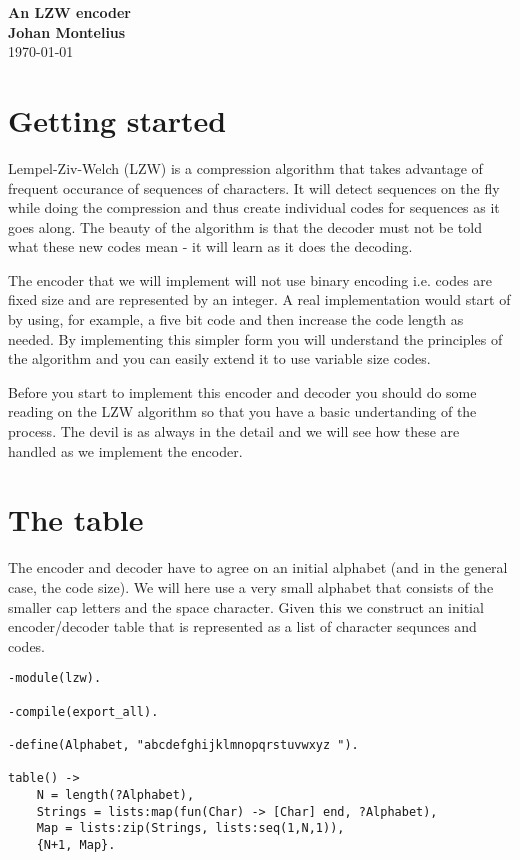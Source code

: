 \documentclass[a4paper,11pt]{article}
\newcommand{\nnsection}[1]{
\section*{#1}
\addcontentsline{toc}{section}{#1}
}
\begin{document}
\begin{center}
\vspace{20pt}
\textbf{\large An LZW encoder}\\
\vspace{10pt}
\textbf{Johan Montelius}\\
\vspace{10pt}
\today{}
\end{center}


\nnsection{Getting started}

Lempel-Ziv-Welch (LZW) is a compression algorithm that takes advantage
of frequent occurance of sequences of characters. It will detect
sequences on the fly while doing the compression and thus create
individual codes for sequences as it goes along. The beauty of the
algorithm is that the decoder must not be told what these new codes
mean - it will learn as it does the decoding.

The encoder that we will implement will not use binary encoding
i.e. codes are fixed size and are represented by an integer. A real
implementation would start of by using, for example, a five bit code
and then increase the code length as needed. By implementing this
simpler form you will understand the principles of the algorithm and
you can easily extend it to use variable size codes.

Before you start to implement this encoder and decoder you should do
some reading on the LZW algorithm so that you have a basic
undertanding of the process. The devil is as always in the detail and
we will see how these are handled as we implement the encoder. 

\section{The table}

The encoder and decoder have to agree on an initial alphabet (and in
the general case, the code size). We will here use a very small
alphabet that consists of the smaller cap letters and the space
character. Given this we construct an initial encoder/decoder table
that is represented as a list of character sequnces and codes. 

\begin{verbatim}
-module(lzw).

-compile(export_all).

-define(Alphabet, "abcdefghijklmnopqrstuvwxyz ").

table() ->   
    N = length(?Alphabet),
    Strings = lists:map(fun(Char) -> [Char] end, ?Alphabet),
    Map = lists:zip(Strings, lists:seq(1,N,1)),
    {N+1, Map}.
\end{verbatim}
\end{document}
